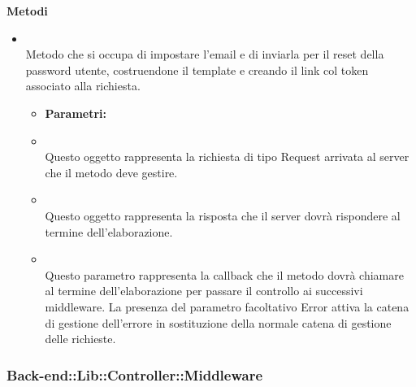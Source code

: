 		\textbf{Metodi} 
	\begin{itemize}
					\item[] \textbf{} \\ Metodo che si occupa di impostare l'email e di inviarla per il reset della password utente, costruendone il template e creando il link col token associato alla richiesta.
						\begin{itemize}\addtolength{\itemsep}{-0.5\baselineskip}
						\item[] \textbf{Parametri:}
						\item[]  \\ Questo oggetto rappresenta la richiesta di tipo Request arrivata al server che il metodo deve gestire.	
						\item[]  \\ Questo oggetto rappresenta la risposta che il server dovrà rispondere al termine dell'elaborazione.	
						\item[]  \\ Questo parametro rappresenta la callback che il metodo dovrà chiamare al termine dell'elaborazione per passare il controllo ai successivi middleware. La presenza del parametro facoltativo Error attiva la catena di gestione dell'errore in sostituzione della normale catena di gestione delle richieste.	
				\end{itemize}
		\end{itemize}
	\subsubsection{Back-end::Lib::Controller::Middleware} 
